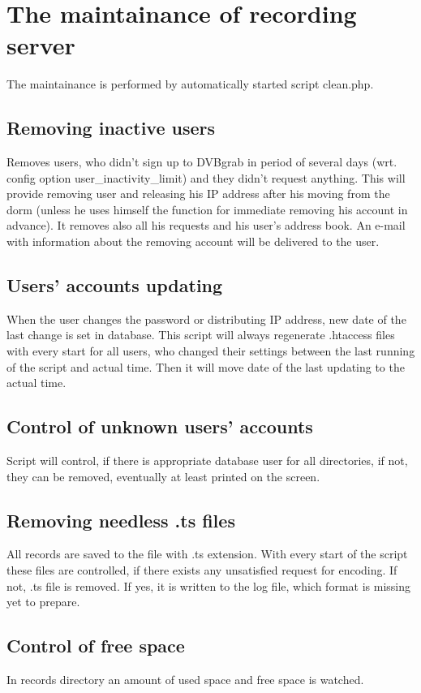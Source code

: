 \section{The maintainance of recording server}
The maintainance is performed by automatically started script clean.php.

\subsection{Removing inactive users}
Removes users, who didn't sign up to DVBgrab in period of several days (wrt. config option user\_inactivity\_limit) and they didn't request anything. This will provide removing user and releasing his IP address after his moving from the dorm (unless he uses himself the function for immediate removing his account in advance). It removes also all his requests and his user's address book. An e-mail with information about the removing account will be delivered to the user.

\subsection{Users' accounts updating}
When the user changes the password or distributing IP address, new date of the last change is set in database. This script will always regenerate .htaccess files with every start for all users, who changed their settings between the last running of the script and actual time. Then it will move date of the last updating to the actual time.

\subsection{Control of unknown users' accounts}
Script will control, if there is appropriate database user for all directories, if not, they can be removed, eventually at least printed on the screen.

\subsection{Removing needless .ts files}
All records are saved to the file with .ts extension. With every start of the script these files are controlled, if there exists any unsatisfied request for encoding. If not, .ts file is removed. If yes, it is written to the log file, which format is missing yet to prepare.

\subsection{Control of free space}
In records directory an amount of used space and free space is watched. 

